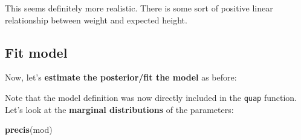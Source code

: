 \documentclass[
]{book}
\newenvironment{Shaded}{\begin{snugshade}}{\end{snugshade}}
\newcommand{\AttributeTok}[1]{\textcolor[rgb]{0.13,0.29,0.53}{#1}}
\newcommand{\CommentTok}[1]{\textcolor[rgb]{0.56,0.35,0.01}{\textit{#1}}}
\newcommand{\DecValTok}[1]{\textcolor[rgb]{0.00,0.00,0.81}{#1}}
\newcommand{\FloatTok}[1]{\textcolor[rgb]{0.00,0.00,0.81}{#1}}
\newcommand{\FunctionTok}[1]{\textcolor[rgb]{0.13,0.29,0.53}{\textbf{#1}}}
\newcommand{\NormalTok}[1]{#1}
\newcommand{\OtherTok}[1]{\textcolor[rgb]{0.56,0.35,0.01}{#1}}
\newcommand{\SpecialCharTok}[1]{\textcolor[rgb]{0.81,0.36,0.00}{\textbf{#1}}}
\begin{document}
This seems definitely more realistic. There is some sort of positive linear relationship
between weight and expected height.

\subsection{Fit model}\label{fit-model}

Now, let's \textbf{estimate the posterior/fit the model} as before:

\begin{Shaded}
\end{Shaded}

Note that the model definition was now directly included in the \texttt{quap} function.
Let's look at the \textbf{marginal distributions} of the parameters:

\begin{Shaded}
\begin{Highlighting}[]
\FunctionTok{precis}\NormalTok{(mod)}
\end{Highlighting}
\end{Shaded}
\end{document}

